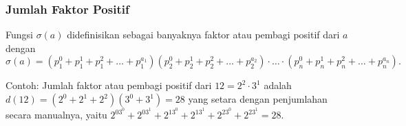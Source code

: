 \subsubsection{Jumlah Faktor Positif}
Fungsi $\sigma (a)$ didefinisikan sebagai banyaknya faktor atau pembagi positif dari $a$ dengan
$$\sigma (a) = (p_1^0+p_1^1+p_1^2+\dots+p_1^{a_1})(p_2^0+p_2^1+p_2^2+\dots+p_2^{a_2})\cdot \ldots \cdot (p_n^0+p_n^1+p_n^2+\dots+p_n^{a_n}).$$

Contoh: Jumlah faktor atau pembagi positif dari $12= 2^2 \cdot 3^1$ adalah $d(12)=(2^0+2^1+2^2)(3^0+3^1)=28$ yang setara dengan penjumlahan secara manualnya, yaitu $2^03^0+2^03^1+2^13^0+2^13^1+2^23^0+2^23^1=28.$
